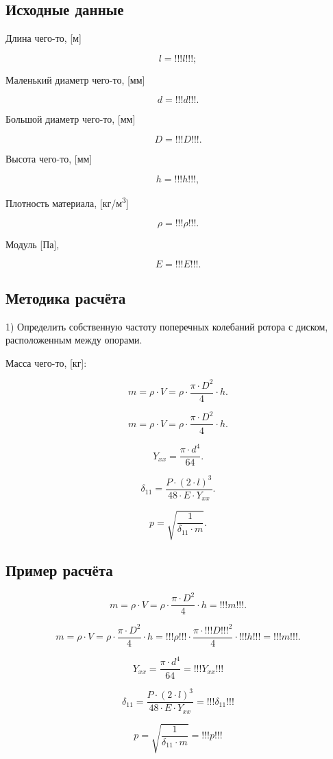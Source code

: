 


    \subsection{Исходные данные}

    Длина чего-то, [м]

    \[l = !!!l!!!;\]

    Маленький диаметр чего-то, [мм]

    \[d = !!!d!!!.\]

    Большой диаметр чего-то, [мм]

    \[D = !!!D!!!.\]

    Высота чего-то, [мм]

    \[h = !!!h!!!,\]

    Плотность материала, [кг/м\textsuperscript{3}]

    \[\rho = !!!\rho!!!.\]

    Модуль [Па],

    \[E = !!!E!!!. \]

    \subsection{Методика расчёта}

    1) Определить собственную частоту поперечных колебаний ротора с диском, расположенным между опорами.

    Масса чего-то, [кг]:

    \[m = \rho\cdot V = \rho\cdot \frac{\pi\cdot D^{2}}{4}\cdot h. \]

    \[m = \rho\cdot V = \rho\cdot \frac{\pi\cdot D^{2}}{4}\cdot h. \]

    \[Y_{\textit{xx}} = \frac{\pi\cdot  d^{4}}{64}.\]

    \[\delta_{11} = \frac{P\cdot {(2\cdot l)}^{3}}{48\cdot E\cdot Y_{\textit{xx}}}.\]

    \[p = \sqrt{\frac{1}{\delta_{11}\cdot m}}.\]

    \subsection{Пример расчёта}

    \[m = \rho\cdot V = \rho\cdot \frac{\pi\cdot D^{2}}{4}\cdot h = !!!m!!!. \]

    \[m = \rho\cdot V = \rho\cdot \frac{\pi\cdot D^{2}}{4}\cdot h = !!!\rho!!! \cdot \frac{\pi\cdot !!!D!!!^{2}}{4}\cdot !!!h!!! = !!!m!!!. \]

    \[Y_{\textit{xx}} = \frac{\pi\cdot  d^{4}}{64} = !!!Y_{\textit{xx}}!!!\]

    \[\delta_{11} = \frac{P\cdot {(2\cdot l)}^{3}}{48\cdot E\cdot Y_{\textit{xx}}} = !!!\delta_{11}!!!\]

    \[p = \sqrt{\frac{1}{\delta_{11}\cdot m}} = !!!p!!!\]

